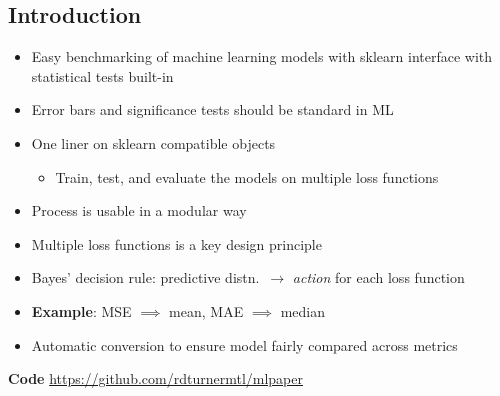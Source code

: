 \documentclass[a0,landscape]{a0poster}
\newcommand{\mysection}[1]{\section*{\fontsize{67.1}{82} \selectfont \color{NavyBlue} #1 \color{Black}}}
\begin{document}
\begin{multicols}{3} %


\Large

\mysection{Introduction}

\begin{itemize}
  \item Easy benchmarking of machine learning models with sklearn interface with statistical tests built-in
  \item Error bars and significance tests should be standard in ML
  \item One liner on sklearn compatible objects
  \begin{itemize}
    \item Train, test, and evaluate the models on multiple loss functions
  \end{itemize}
  \item Process is usable in a modular way
\end{itemize}

\begin{itemize}
  \item Multiple loss functions is a key design principle
  \item Bayes' decision rule: predictive distn.~$\rightarrow$ \emph{action} for each loss function
  \item \textbf{Example}: MSE $\implies$ mean, MAE $\implies$ median
  \item Automatic conversion to ensure model fairly compared across metrics
\end{itemize}
\vspace{17mm}
\textbf{Code}
\large {\url{https://github.com/rdturnermtl/mlpaper}}
\vspace{7mm}

\columnbreak


\end{multicols}
\end{document}
